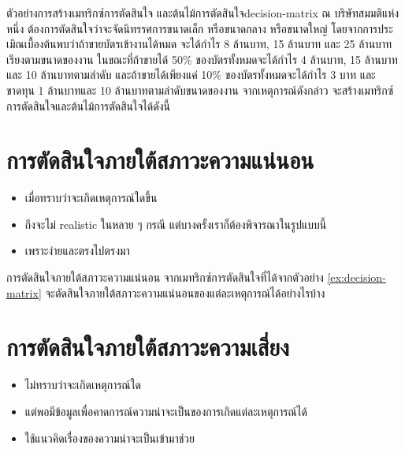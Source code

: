 \begin{example}
    {ตัวอย่างการสร้างเมทริกซ์การตัดสินใจ และต้นไม้การตัดสินใจ}{decision-matrix}
    ณ บริษัทสมมติแห่งหนึ่ง ต้องการตัดสินใจว่าจะจัดนิทรรศการขนาดเล็ก หรือขนาดกลาง หรือขนาดใหญ่ โดยจากการประเมิณเบื้องต้นพบว่าถ้าขายบัตรเข้างานได้หมด จะได้กำไร 8 ล้านบาท, 15 ล้านบาท และ 25 ล้านบาทเรียงตามขนาดของงาน ในขณะที่ถ้าขายได้ 50\% ของบัตรทั้งหมดจะได้กำไร 4 ล้านบาท, 15 ล้านบาท และ 10 ล้านบาทตามลำดับ และถ้าขายได้เพียงแค่ 10\% ของบัตรทั้งหมดจะได้กำไร 3 บาท และขาดทุน 1 ล้านบาทและ 10 ล้านบาทตามลำดับขนาดของงาน จากเหตุการณ์ดังกล่าว จะสร้างเมทริกซ์การตัดสินใจและต้นไม้การตัดสินใจได้ดังนี้
\end{example}
\newpage

\section{การตัดสินใจภายใต้สภาวะความแน่นอน}
\begin{itemize}
    \item เมื่อทราบว่าจะเกิดเหตุการณ์ใดขึ้น
    \item ถึงจะไม่ realistic ในหลาย ๆ กรณี แต่บางครั้งเราก็ต้องพิจารณาในรูปแบบนี้
    \item เพราะง่ายและตรงไปตรงมา
\end{itemize}

\begin{example}
    {การตัดสินใจภายใต้สภาวะความแน่นอน}{}
    จากเมทริกซ์การตัดสินใจที่ได้จากตัวอย่าง \ref{ex:decision-matrix} จะตัดสินใจภายใต้สภาวะความแน่นอนของแต่ละเหตุการณ์ได้อย่างไรบ้าง
\end{example}

\newpage
\section{การตัดสินใจภายใต้สภาวะความเสี่ยง}
\begin{itemize}
    \item ไม่ทราบว่าจะเกิดเหตุการณ์ใด
    \item แต่พอมีข้อมูลเพื่อคาดการณ์ความน่าจะเป็นของการเกิดแต่ละเหตุการณ์ได้
    \item ใช้แนวคิดเรื่องของความน่าจะเป็นเข้ามาช่วย
\end{itemize}

